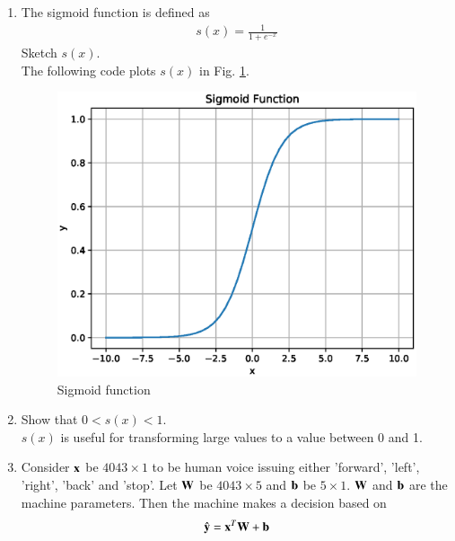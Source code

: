 \documentclass[journal,12pt,twocolumn]{IEEEtran}
\renewcommand\thesection{\arabic{section}}
\begin{document}
\begin{enumerate}[label=\thesection.\arabic*
,ref=\thesection.\theenumi]
\\
\solution See Table \ref{fig:ref_vec}.
\begin{table}[!ht]
\begin{center}

\end{center}
\caption{Reference vectors}
\label{fig:ref_vec}
\end{table}
%
\item The sigmoid function is defined as
\begin{align}
\label{eq:sig}
s(x) = \frac{1}{1+e^{-x}}
\end{align}
Sketch $s(x)$.
\\
\solution The following code plots $s(x)$ in Fig. \ref{fig:sigmoid}.
\begin{figure}[ht!]
\begin{center}
\includegraphics[width=\columnwidth]{./figs/sigmoid.eps}
\end{center}
\caption{Sigmoid function }
\label{fig:sigmoid}
\end{figure}
\item Show that $0 < s(x) < 1$.
\\
\solution $s(x)$ is useful for transforming large values to a value between 0 and 1.
\item Consider $\mathbf{x}$ be $4043 \times 1$ to be human voice issuing either 'forward', 'left', 
'right', 'back'  and 
'stop'.  Let $\mathbf{W}$ be $4043 \times 5$ and $\mathbf{b}$ be $5 \times 1$. $\mathbf{W}$ and $\mathbf{b}$ 
are the machine parameters. Then the machine makes a decision based on
\begin{equation}
\label{eq:model}
\hat{\mathbf{y}} = \mathbf{x}^{T}\mathbf{W}+ \mathbf{b}
\end{equation}


\end{enumerate}
\end{document}
